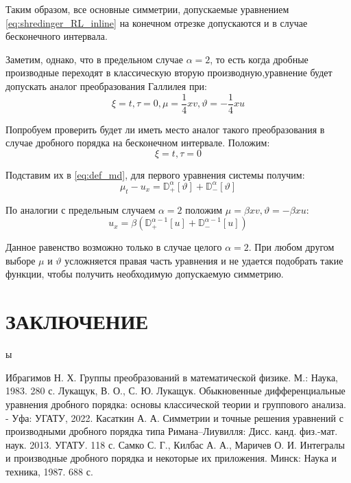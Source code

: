 \documentclass[a4paper, fontsize=14pt]{article}
\newcommand{\MD}[2]{\mathbb{D}_{#1}^{\alpha}[#2]} %
\begin{document}
Таким образом, все основные симметрии, допускаемые уравнением \eqref{eq:shredinger_RL_inline} на конечном отрезке допускаются и в случае бесконечного интервала.

Заметим, однако, что в предельном случае $\alpha = 2$, то есть когда дробные производные переходят в классическую вторую производную,уравнение будет допускать аналог преобразования Галлилея при:
\begin{equation*}
  \xi = t, \tau = 0, \mu = \frac{1}{4} xv, \vartheta = - \frac{1}{4} xu
\end{equation*}

Попробуем проверить будет ли иметь место аналог такого преобразования в случае дробного порядка на бесконечном интервале. Положим:
\begin{equation*}
  \xi = t, \tau = 0
\end{equation*}

Подставим их в \eqref{eq:def_md}, для первого уравнения системы получим:
\begin{equation*}
  \mu_t - u_x = \MD{+}{\vartheta} + \MD{-}{\vartheta}
\end{equation*}

По аналогии с предельным случаем $\alpha = 2$  положим $\mu = \beta x v, \vartheta = - \beta x u$:
\begin{equation*}
  u_x = \beta \left(\mathbb{D}_{+}^{\alpha-1}[u] + \mathbb{D}_{-}^{\alpha-1}[u]\right)
\end{equation*}

Данное равенство возможно только в случае целого $\alpha = 2$.
При любом другом выборе $\mu$ и $\vartheta$ усложняется правая часть уравнения и не удается подобрать такие функции,
чтобы получить необходимую допускаемую симметрию.
\newpage
\section*{ЗАКЛЮЧЕНИЕ}ы


\newpage

\begin{thebibliography}{9}
  Ибрагимов Н. Х. Группы преобразований в математической физике. М.: Наука, 1983. 280 с.
  Лукащук, В. О., С. Ю. Лукащук. Обыкновенные дифференциальные уравнения дробного порядка: основы классической теории и группового анализа. - Уфа: УГАТУ, 2022. 
  Касаткин А. А. Симметрии и точные решения уравнений с производными дробного порядка типа Римана–Лиувилля: Дисс. канд. физ.-мат. наук. 2013. УГАТУ. 118 с.
  Самко С. Г., Килбас А. А., Маричев О. И. Интегралы и производные дробного порядка и некоторые их приложения. Минск: Наука и техника, 1987. 688 с.
\end{thebibliography}

% 
\end{document}
